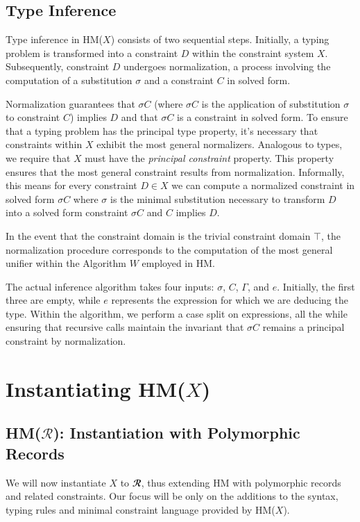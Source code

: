\documentclass[runningheads]{llncs}
\newcommand{\hmx}{HM($X$)}
\newcommand{\hmr}{HM($\mathcal{R}$)}
\begin{document}
\subsection{Type Inference}
Type inference in \hmx{} consists of two sequential steps. Initially, a
typing
problem is transformed into a constraint $D$ within the constraint system
$X$.
Subsequently, constraint $D$ undergoes normalization, a process involving
the
computation of a substitution $σ$ and a constraint $C$ in solved form.

Normalization
guarantees that $σC$ (where $σC$ is the application of substitution $σ$
to
constraint $C$)
implies $D$ and that $σC$ is a constraint in solved form.
To ensure that a typing problem has the principal type property, it's
necessary
that constraints within $X$ exhibit the most general normalizers.
Analogous
to
types, we require that $X$ must have the \emph{principal constraint}
property.
This property ensures that the most general constraint results from
normalization.
Informally, this means for every constraint $D ∈ X$ we can compute a
normalized constraint in solved form $σC$ where $σ$ is the minimal
substitution
necessary to transform $D$ into a solved form constraint $σC$ and $C$
implies
$D$.

In the event that the constraint domain is the trivial constraint domain
$\top$, the normalization procedure corresponds to the computation of the
most
general unifier within the Algorithm $W$ employed in HM.

The actual inference algorithm takes four inputs: $σ$, $C$, $Γ$, and $e$.
Initially, the first three are empty, while $e$ represents the expression
for
which we are deducing the type.
Within the algorithm, we perform a case split on expressions, all the
while
ensuring that recursive calls maintain the invariant that $σC$ remains a
principal constraint by normalization.

\section{Instantiating \hmx{}}
\subsection{\hmr{}: Instantiation with Polymorphic Records}
We will now instantiate $X$ to $𝓡$, thus extending HM with
polymorphic records and related constraints. Our focus will be only on the additions to the syntax, typing rules and minimal constraint language provided by \hmx{}.
\end{document}
